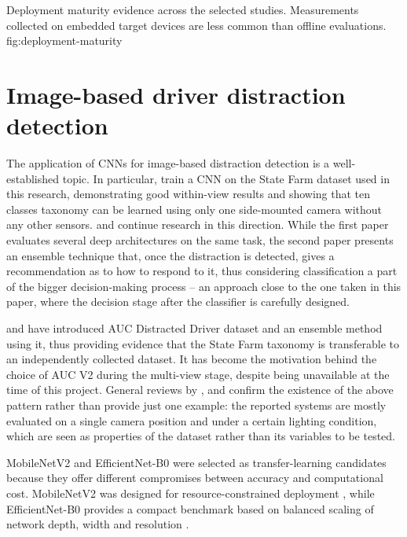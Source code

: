 {Deployment maturity evidence across the selected studies. Measurements collected on embedded target devices are less common than offline evaluations.}
{fig:deployment-maturity}

\FloatBarrier

\section{Image-based driver distraction detection}

The application of CNNs for image-based distraction detection is a well-established topic. In particular, \citet{valeriano2018recognition} train a CNN on the State Farm dataset used in this research, demonstrating good within-view results and showing that ten classes taxonomy can be learned using only one side-mounted camera without any other sensors. \citet{alshalfan2021detecting} and \citet{aljasim2022e2dr} continue research in this direction. While the first paper evaluates several deep architectures on the same task, the second paper presents an ensemble technique that, once the distraction is detected, gives a recommendation as to how to respond to it, thus considering classification a part of the bigger decision-making process – an approach close to the one taken in this paper, where the decision stage after the classifier is carefully designed.

\citet{abouelnaga2018} and \citet{eraqi2019driver} have introduced AUC Distracted Driver dataset and an ensemble method using it, thus providing evidence that the State Farm taxonomy is transferable to an independently collected dataset. It has become the motivation behind the choice of AUC V2 during the multi-view stage, despite being unavailable at the time of this project. General reviews by \citet{kashevnik2021driver}, \citet{horgan2021} and \citet{dontoh2025visual} confirm the existence of the above pattern rather than provide just one example: the reported systems are mostly evaluated on a single camera position and under a certain lighting condition, which are seen as properties of the dataset rather than its variables to be tested.

MobileNetV2 and EfficientNet-B0 were selected as transfer-learning candidates because they offer different compromises between accuracy and computational cost. MobileNetV2 was designed for resource-constrained deployment \citep{sandler2018mobilenetv2}, while EfficientNet-B0 provides a compact benchmark based on balanced scaling of network depth, width and resolution \citep{tan2019efficientnet}.

